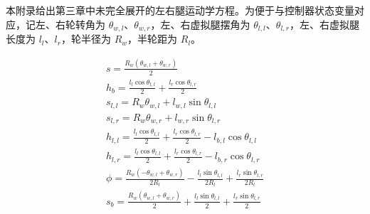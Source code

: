 \label{app:kinematics}

本附录给出第三章中未完全展开的左右腿运动学方程。为便于与控制器状态变量对应，记左、右轮转角为 $\theta_{w,l}$、$\theta_{w,r}$，左、右虚拟腿摆角为 $\theta_{l,l}$、$\theta_{l,r}$，左、右虚拟腿长度为 $l_l$、$l_r$，轮半径为 $R_w$，半轮距为 $R_l$。


\begin{gather}
  s = \frac{R_w(\theta_{w,l}+\theta_{w,r})}{2} \\
  h_b = \frac{l_l\cos\theta_{l,l}}{2}+\frac{l_r\cos\theta_{l,r}}{2} \\
  s_{l,l} = R_w\theta_{w,l}+l_{w,l}\sin\theta_{l,l} \\
  s_{l,r} = R_w\theta_{w,r}+l_{w,r}\sin\theta_{l,r} \\
  h_{l,l} = \frac{l_l\cos\theta_{l,l}}{2}+\frac{l_r\cos\theta_{l,r}}{2}-l_{b,l}\cos\theta_{l,l} \\
  h_{l,r} = \frac{l_l\cos\theta_{l,l}}{2}+\frac{l_r\cos\theta_{l,r}}{2}-l_{b,r}\cos\theta_{l,r} \\
  \phi = \frac{R_w(-\theta_{w,l}+\theta_{w,r})}{2R_l}
  -\frac{l_l\sin\theta_{l,l}}{2R_l}
  +\frac{l_r\sin\theta_{l,r}}{2R_l} \\
  s_b = \frac{R_w(\theta_{w,l}+\theta_{w,r})}{2}
  +\frac{l_l\sin\theta_{l,l}}{2}
  +\frac{l_r\sin\theta_{l,r}}{2}
\end{gather}


